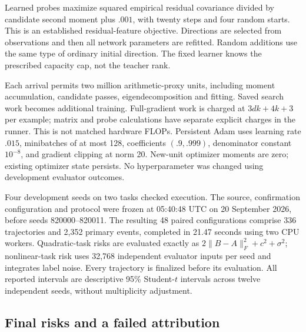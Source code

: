 Learned probes maximize squared empirical residual covariance divided by
candidate second moment plus $.001$, with twenty steps and four random
starts. This is an established residual-feature objective. Directions are
selected from observations and then all network parameters are refitted.
Random additions use the same type of ordinary initial direction. The fixed
learner knows the prescribed capacity cap, not the teacher rank.

Each arrival permits two million arithmetic-proxy units, including moment
accumulation, candidate passes, eigendecomposition and fitting. Saved search
work becomes additional training. Full-gradient work is charged at
$3dk+4k+3$ per example; matrix and probe calculations have separate explicit
charges in the runner. This is not matched hardware FLOPs. Persistent Adam
uses learning rate $.015$, minibatches of at most 128, coefficients
$(.9,.999)$, denominator constant $10^{-8}$, and gradient clipping at norm
20. New-unit optimizer moments are zero; existing optimizer state persists.
No hyperparameter was changed using development evaluator outcomes.

Four development seeds on two tasks checked execution. The source,
confirmation configuration and protocol were frozen at 05:40:48 UTC on
20 September 2026, before seeds 820000--820011. The resulting 48 paired
configurations comprise 336 trajectories and 2,352 primary events, completed
in 21.47 seconds using two CPU workers. Quadratic-task risks are evaluated
exactly as $2\|B-A\|_F^2+c^2+\sigma^2$; nonlinear-task risk uses 32,768
independent evaluator inputs per seed and integrates label noise. Every
trajectory is finalized before its evaluation. All reported intervals are
descriptive 95\% Student-$t$ intervals across twelve independent seeds,
without multiplicity adjustment.

\subsection{Final risks and a failed attribution}
\begin{table}[tb]
\centering\small

\caption{Mean final population MSE, generated from the frozen raw results.
All methods finish at width seven. The rank-two task is noiseless; the other
quadratic noise floors are $.25$ and $.09$. Nonlinear risks here use the
prespecified Monte Carlo evaluator. Full intervals and every paired contrast
are supplied as CSV.}
\label{tab:quadratic-results}
\end{table}

